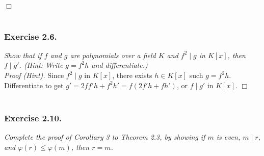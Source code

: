 \documentclass{article}
\begin{document}
$\Box$ \\\\






\subsubsection*{Exercise 2.6.}
\emph{Show that if $f$ and $g$ are polynomials over a field $K$ and
$f^2 \mid g$ in $K[x]$, then $f \mid g'$.
(Hint: Write $g = f^2 h$ and differentiate.)} \\

\emph{Proof (Hint).}
Since $f^2 \mid g$ in $K[x]$, there exists $h \in K[x]$ such $g = f^2 h$.
Differentiate to get $g' = 2f f' h + f^2 h' = f(2f'h + fh')$,
or $f \mid g'$ in $K[x]$.
$\Box$ \\\\






\subsubsection*{Exercise 2.10.}
\emph{Complete the proof of Corollary 3 to Theorem 2.3,
by showing if $m$ is even, $m \mid r$, and $\varphi(r) \leq \varphi(m)$, then $r = m$.} \\
\end{document}
